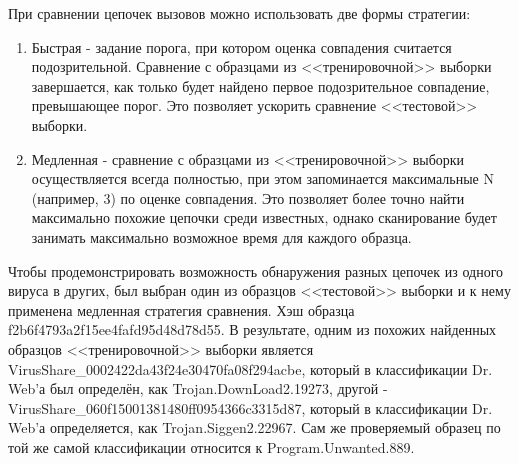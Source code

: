 При сравнении цепочек вызовов можно использовать две формы стратегии:
\begin {enumerate}
	\item Быстрая - задание порога, при котором оценка совпадения считается подозрительной. Сравнение с образцами из <<тренировочной>> выборки завершается, как только будет найдено первое подозрительное совпадение, превышающее порог. Это позволяет ускорить сравнение <<тестовой>> выборки. 
	\item Медленная - сравнение с образцами из <<тренировочной>> выборки осуществляется всегда полностью, при этом запоминается максимальные N (например, 3) по оценке совпадения. Это позволяет более точно найти максимально похожие цепочки среди известных, однако сканирование будет занимать максимально возможное время для каждого образца.
\end {enumerate}

Чтобы продемонстрировать возможность обнаружения разных цепочек из одного вируса в других, был выбран один из образцов <<тестовой>> выборки и к нему применена медленная стратегия сравнения. Хэш образца f2b6f4793a2f15ee4fafd95d48d78d55. В результате, одним из похожих найденных образцов <<тренировочной>> выборки является VirusShare\_0002422da43f24e30470fa08f294acbe, который в классификации Dr. Web'а был определён, как Trojan.DownLoad2.19273, другой - VirusShare\_060f15001381480ff0954366c3315d87, который в  классификации Dr. Web'а определяется, как Trojan.Siggen2.22967. Сам же проверяемый образец по той же самой классификации относится к Program.Unwanted.889.


